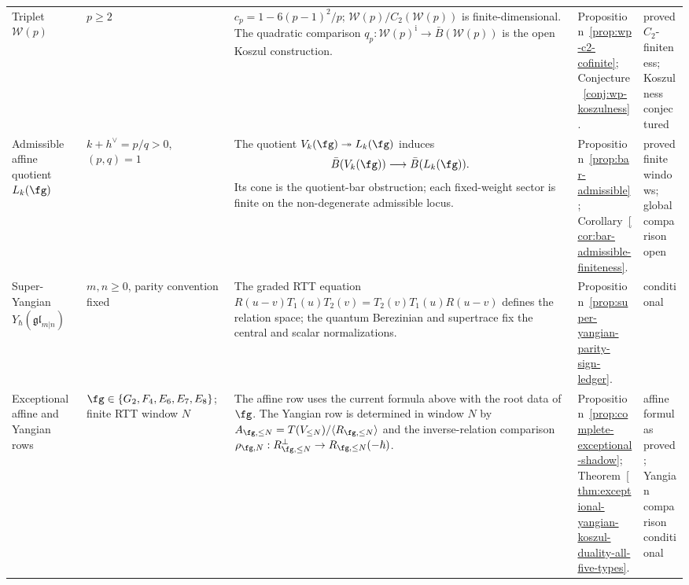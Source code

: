 {\begin{longtable}{@{}p{}p{}p{}p{}p{}@{}}
Triplet \(\mathcal W(p)\) &
\(p\ge2\) &
\(c_p=1-6(p-1)^2/p\);
\(\mathcal W(p)/C_2(\mathcal W(p))\) is finite-dimensional.
The quadratic comparison
\(q_p:\mathcal W(p)^{\mathrm i}\to\bar B(\mathcal W(p))\)
is the open Koszul construction. &
Proposition~\ref{prop:wp-c2-cofinite};
Conjecture~\ref{conj:wp-koszulness}. &
proved \(C_2\)-finiteness; Koszulness conjectured \\

Admissible affine quotient \(L_k(\fg)\) &
\(k+h^\vee=p/q>0\), \((p,q)=1\) &
The quotient \(V_k(\fg)\twoheadrightarrow L_k(\fg)\) induces
\[
\bar B(V_k(\fg))\longrightarrow\bar B(L_k(\fg)).
\]
Its cone is the quotient-bar obstruction; each fixed-weight sector
is finite on the non-degenerate admissible locus. &
Proposition~\ref{prop:bar-admissible};
Corollary~\ref{cor:bar-admissible-finiteness}. &
proved finite windows; global comparison open \\

Super-Yangian \(Y_\hbar(\mathfrak{gl}_{m|n})\) &
\(m,n\ge0\), parity convention fixed &
The graded RTT equation
\(R(u-v)T_1(u)T_2(v)=T_2(v)T_1(u)R(u-v)\)
defines the relation space; the quantum Berezinian and supertrace fix
the central and scalar normalizations. &
Proposition~\ref{prop:super-yangian-parity-sign-ledger}. &
conditional \\

Exceptional affine and Yangian rows &
\(\fg\in\{G_2,F_4,E_6,E_7,E_8\}\);
finite RTT window \(N\) &
The affine row uses the current formula above with the root data of
\(\fg\).  The Yangian row is determined in window \(N\) by
\(A_{\fg,\le N}=T(V_{\le N})/\langle R_{\fg,\le N}\rangle\)
and the inverse-relation comparison
\(\rho_{\fg,N}:R_{\fg,\le N}^{\perp}\to
R_{\fg,\le N}(-\hbar)\). &
Proposition~\ref{prop:complete-exceptional-shadow};
Theorem~\ref{thm:exceptional-yangian-koszul-duality-all-five-types}. &
affine formulas proved; Yangian comparison conditional \\
\bottomrule
\end{longtable}
}

